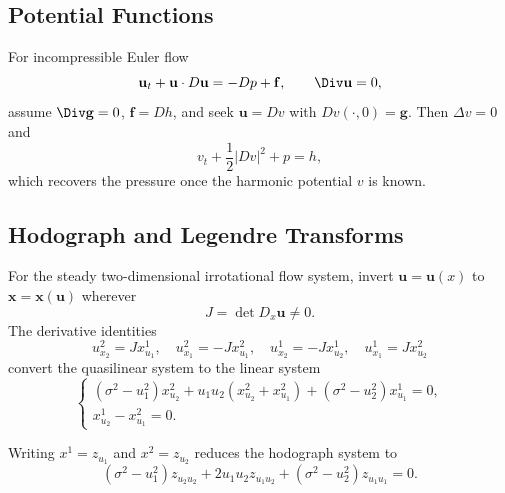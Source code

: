 \subsection{Potential Functions}
\label{sec:potential-functions}

\begin{example}
\label{ex:euler-equations-potential-function}
For incompressible Euler flow
\[
\mathbf u_t+\mathbf u\cdot D\mathbf u=-Dp+\mathbf f,\qquad
\Div\mathbf u=0,
\]
assume $\Div\mathbf g=0$, $\mathbf f=Dh$, and seek $\mathbf u=Dv$ with
$Dv(\cdot,0)=\mathbf g$. Then $\Delta v=0$ and
\[
v_t+\frac12|Dv|^2+p=h,
\]
which recovers the pressure once the harmonic potential $v$ is known.
\end{example}

\subsection{Hodograph and Legendre Transforms}
\label{sec:hodograph-legendre-transforms}

\begin{example}
\label{ex:hodograph-transform-irrotational-flow}
For the steady two-dimensional irrotational flow system, invert
$\mathbf u=\mathbf u(x)$ to $\mathbf x=\mathbf x(\mathbf u)$ wherever
\[
J=\det D_x\mathbf u\ne0.
\]
The derivative identities
\[
u^2_{x_2}=Jx^1_{u_1},\quad u^2_{x_1}=-Jx^2_{u_1},\quad
u^1_{x_2}=-Jx^1_{u_2},\quad u^1_{x_1}=Jx^2_{u_2}
\]
convert the quasilinear system to the linear system
\[
\begin{cases}
(\sigma^2-u_1^2)x^2_{u_2}+u_1u_2(x^2_{u_2}+x^2_{u_1})
+(\sigma^2-u_2^2)x^1_{u_1}=0,\\
x^1_{u_2}-x^2_{u_1}=0.
\end{cases}
\]
\end{example}

\begin{remark}
\label{rem:hodograph-potential-simplification}
Writing $x^1=z_{u_1}$ and $x^2=z_{u_2}$ reduces the hodograph system to
\[
(\sigma^2-u_1^2)z_{u_2u_2}+2u_1u_2z_{u_1u_2}
+(\sigma^2-u_2^2)z_{u_1u_1}=0.
\]
\end{remark}


